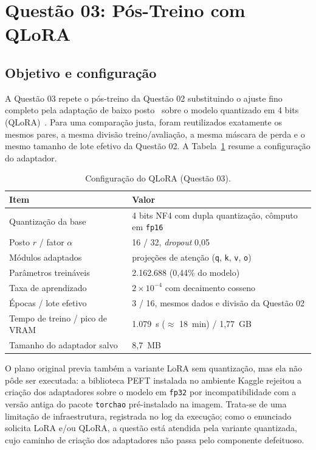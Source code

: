 \section{Questão 03: Pós-Treino com QLoRA}
\label{sec:q3}

\subsection{Objetivo e configuração}

A Questão 03 repete o pós-treino da Questão 02 substituindo o ajuste fino completo
pela adaptação de baixo posto~\cite{hu2022lora} sobre o modelo quantizado em 4 bits
(QLoRA)~\cite{dettmers2023qlora}. Para uma comparação justa, foram reutilizados
exatamente os mesmos pares, a mesma divisão treino/avaliação, a mesma máscara de
perda e o mesmo tamanho de lote efetivo da Questão 02. A Tabela~\ref{tab:q3-hiper}
resume a configuração do adaptador.

\begin{table}[ht]
  \centering
  \caption{Configuração do QLoRA (Questão 03).}
  \label{tab:q3-hiper}
  \footnotesize
  \begin{tabularx}{0.92\textwidth}{@{}l X@{}}
    \toprule
    \textbf{Item} & \textbf{Valor} \\
    \midrule
    Quantização da base & 4 bits NF4 com dupla quantização, cômputo em \texttt{fp16} \\
    Posto $r$ / fator $\alpha$ & 16 / 32, \textit{dropout} 0,05 \\
    Módulos adaptados & projeções de atenção (\texttt{q}, \texttt{k}, \texttt{v}, \texttt{o}) \\
    Parâmetros treináveis & 2.162.688 (0,44\% do modelo) \\
    Taxa de aprendizado & $2 \times 10^{-4}$ com decaimento cosseno \\
    Épocas / lote efetivo & 3 / 16, mesmos dados e divisão da Questão 02 \\
    Tempo de treino / pico de VRAM & 1.079~s ($\approx$ 18~min) / 1,77~GB \\
    Tamanho do adaptador salvo & 8,7~MB \\
    \bottomrule
  \end{tabularx}
\end{table}

O plano original previa também a variante LoRA sem quantização, mas ela não pôde ser
executada: a biblioteca PEFT instalada no ambiente Kaggle rejeitou a criação dos
adaptadores sobre o modelo em \texttt{fp32} por incompatibilidade com a versão
antiga do pacote \texttt{torchao} pré-instalado na imagem. Trata-se de uma limitação
de infraestrutura, registrada no log da execução; como o enunciado solicita LoRA
e/ou QLoRA, a questão está atendida pela variante quantizada, cujo caminho de
criação dos adaptadores não passa pelo componente defeituoso.

